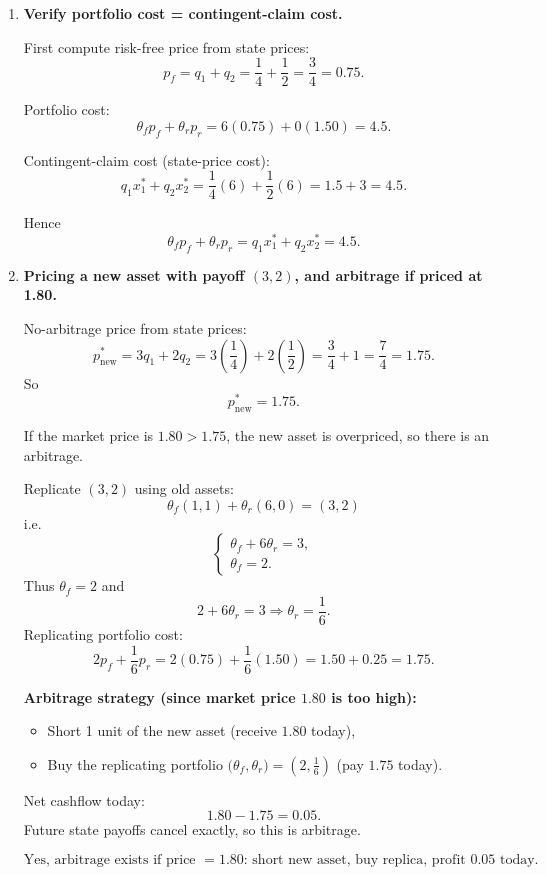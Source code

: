 \documentclass[12pt]{article}
\begin{document}
\begin{enumerate}[label=(\alph*)]
Payoff vectors:
\[
a_f=(1,1),\qquad a_r=(6,0).
\]
Find \((\theta_f,\theta_r)\) such that
\[
\theta_f(1,1)+\theta_r(6,0)=(6,6).
\]
Equivalently,
\[
\begin{cases}
\theta_f+6\theta_r=6,\\
\theta_f=6.
\end{cases}
\]
From the second equation, \(\theta_f=6\). Substituting into the first:
\[
6+6\theta_r=6 \Rightarrow \theta_r=0.
\]
Thus
\[
\boxed{(\theta_f,\theta_r)=(6,0).}
\]

\item \textbf{Verify portfolio cost = contingent-claim cost.}

First compute risk-free price from state prices:
\[
p_f=q_1+q_2=\frac14+\frac12=\frac34=0.75.
\]

Portfolio cost:
\[
\theta_f p_f+\theta_r p_r = 6(0.75)+0(1.50)=4.5.
\]

Contingent-claim cost (state-price cost):
\[
q_1x_1^*+q_2x_2^*
=\frac14(6)+\frac12(6)=1.5+3=4.5.
\]

Hence
\[
\boxed{\theta_f p_f+\theta_r p_r = q_1x_1^*+q_2x_2^*=4.5.}
\]

\item \textbf{Pricing a new asset with payoff \((3,2)\), and arbitrage if priced at 1.80.}

No-arbitrage price from state prices:
\[
p_{\text{new}}^*=3q_1+2q_2=3\left(\frac14\right)+2\left(\frac12\right)=\frac34+1=\frac74=1.75.
\]
So
\[
\boxed{p_{\text{new}}^*=1.75.}
\]

If the market price is \(1.80>1.75\), the new asset is overpriced, so there is an arbitrage.

Replicate \((3,2)\) using old assets:
\[
\theta_f(1,1)+\theta_r(6,0)=(3,2)
\]
i.e.
\[
\begin{cases}
\theta_f+6\theta_r=3,\\
\theta_f=2.
\end{cases}
\]
Thus \(\theta_f=2\) and
\[
2+6\theta_r=3 \Rightarrow \theta_r=\frac16.
\]
Replicating portfolio cost:
\[
2p_f+\frac16 p_r = 2(0.75)+\frac16(1.50)=1.50+0.25=1.75.
\]

\textbf{Arbitrage strategy (since market price \(1.80\) is too high):}
\begin{itemize}
\item Short 1 unit of the new asset (receive \(1.80\) today),
\item Buy the replicating portfolio \(\big(\theta_f,\theta_r\big)=\left(2,\frac16\right)\) (pay \(1.75\) today).
\end{itemize}
Net cashflow today:
\[
1.80-1.75=\boxed{0.05}.
\]
Future state payoffs cancel exactly, so this is arbitrage.

\[
\boxed{\text{Yes, arbitrage exists if price }=1.80\text{: short new asset, buy replica, profit }0.05\text{ today.}}
\]
\end{enumerate}
\end{document}
